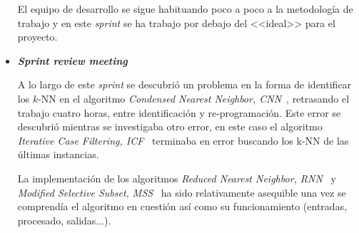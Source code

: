 \begin{itemize}
El equipo de desarrollo se sigue habituando poco a poco a la metodología de trabajo y en este \textit{sprint} se ha trabajo por debajo del <<ideal>> para el proyecto. 

\item \textbf{\textit{Sprint review meeting}}

A lo largo de este \textit{sprint} se descubrió un problema en la forma de identificar los $k$-NN en el algoritmo \textit{Condensed Nearest Neighbor, CNN}~\cite{hart1968condensed}, retrasando el trabajo cuatro horas, entre identificación y re-programación. Este error se descubrió mientras se investigaba otro error, en este caso el algoritmo \textit{Iterative Case Filtering, ICF}~\cite{brighton2002advances} terminaba en error buscando los k-NN de las últimas instancias.

La implementación de los algoritmos \textit{Reduced Nearest Neighbor, RNN}~\cite{gates1972reduced} y \textit{Modified Selective Subset, MSS}~\cite{barandela2005decision} ha sido relativamente asequible una vez se comprendía el algoritmo en cuestión así como su funcionamiento (entradas, procesado, salidas...).
\end{itemize}

